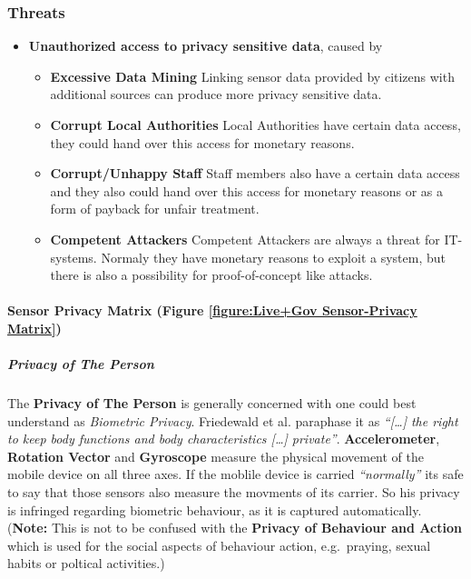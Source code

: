 \subsubsection{Threats}



\begin{itemize}

\item
  \textbf{Unauthorized access to privacy sensitive data}, caused by
  \begin{itemize}
  \item
    \textbf{Excessive Data Mining} Linking sensor data provided by
    citizens with additional sources can produce more privacy sensitive
    data.
  \item
    \textbf{Corrupt Local Authorities} Local Authorities have certain data
    access, they could hand over this access for monetary reasons.
  \item
    \textbf{Corrupt/Unhappy Staff} Staff members also have a certain data
    access and they also could hand over this access for monetary reasons
    or as a form of payback for unfair treatment.
  \item
    \textbf{Competent Attackers} Competent Attackers are always a threat
    for IT-systems. Normaly they have monetary reasons to exploit a
    system, but there is also a possibility for proof-of-concept like
    attacks.
  \end{itemize}
\end{itemize}


\paragraph{Sensor Privacy Matrix (Figure \ref{figure:Live+Gov Sensor-Privacy Matrix})}



\subparagraph{Privacy of The Person}

The \textbf{Privacy of The Person} is generally concerned with one could
best understand as \emph{Biometric Privacy}. Friedewald et al. paraphase
it as \emph{``{[}\ldots{}{]} the right to keep body functions and body
characteristics {[}\ldots{}{]} private''}. \textbf{Accelerometer},
\textbf{Rotation Vector} and \textbf{Gyroscope} measure the physical
movement of the mobile device on all three axes. If the moblile device
is carried \emph{``normally''} its safe to say that those sensors also
measure the movments of its carrier. So his privacy is infringed
regarding biometric behaviour, as it is captured automatically.
(\textbf{Note:} This is not to be confused with the \textbf{Privacy of
Behaviour and Action} which is used for the social aspects of behaviour
action, e.g.~praying, sexual habits or poltical activities.)

